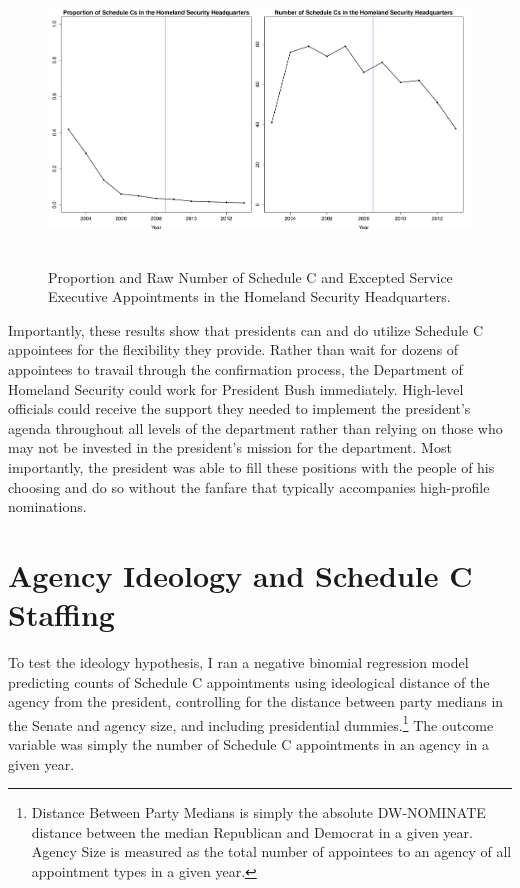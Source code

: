 \documentclass[12pt]{article}
\begin{document}
\begin{figure}[!h]
\begin{center}
\includegraphics[height=3in,width=6in]{DHSProportionRawNumber.pdf}
\caption{Proportion and Raw Number of Schedule C and Excepted Service Executive Appointments in the Homeland Security Headquarters.}
\end{center}
\end{figure}

Importantly, these results show that presidents can and do utilize Schedule C appointees for the flexibility they provide. Rather than wait for dozens of appointees to travail through the confirmation process, the Department of Homeland Security could work for President Bush immediately. High-level officials could receive the support they needed to implement the president's agenda throughout all levels of the department rather than relying on those who may not be invested in the president's mission for the department. Most importantly, the president was able to fill these positions with the people of his choosing and do so without the fanfare that typically accompanies high-profile nominations. 


\section*{Agency Ideology and Schedule C Staffing}
To test the ideology hypothesis, I ran a negative binomial regression model predicting counts of Schedule C appointments using ideological distance of the agency from the president, controlling for the distance between party medians in the Senate and agency size, and including presidential dummies.\footnote{Distance Between Party Medians is simply the absolute DW-NOMINATE distance between the median Republican and Democrat in a given year. Agency Size is measured as the total number of appointees to an agency of all appointment types in a given year.} The outcome variable was simply the number of Schedule C appointments in an agency in a given year.
\end{document}
